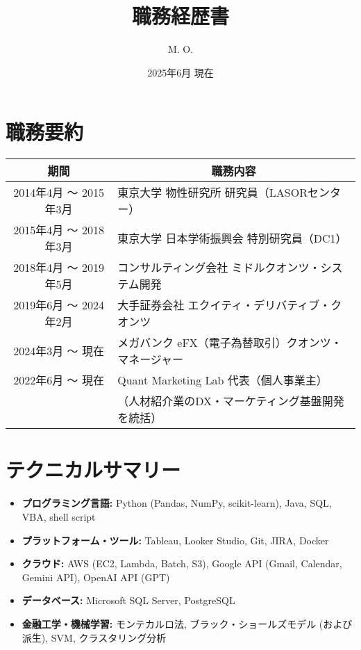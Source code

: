 \documentclass[uplatex,a4j,10.5pt,dvipdfmx]{jsarticle}
\title{\sffamily \bfseries 職務経歴書}
\author{M. O.}
\date{2025年6月 現在}
\begin{document}
\maketitle

\section{職務要約}

\begin{longtable}{|c|p{14cm}|}
	\hline
	\multicolumn{1}{|c|}{\textbf{期間}} & \multicolumn{1}{c|}{\textbf{職務内容}} \\
	\hline
	\endhead

	\hline
	2014年4月 ～ 2015年3月                 & 東京大学 物性研究所 研究員（LASORセンター）          \\
	\hline
	2015年4月 ～ 2018年3月                 & 東京大学 日本学術振興会 特別研究員（DC1）            \\
	\hline
	2018年4月 ～ 2019年5月                 & コンサルティング会社 ミドルクオンツ・システム開発          \\
	\hline
	2019年6月 ～ 2024年2月                 & 大手証券会社 エクイティ・デリバティブ・クオンツ           \\
	\hline
	2024年3月 ～ 現在                      & メガバンク eFX（電子為替取引）クオンツ・マネージャー       \\
    \hline
    2022年6月 ～ 現在 & Quant Marketing Lab 代表（個人事業主） \\
     & （人材紹介業のDX・マーケティング基盤開発を統括） \\
    \hline
\end{longtable}

\section{テクニカルサマリー}
\begin{itemize}
	\item \textbf{プログラミング言語:} Python (Pandas, NumPy, scikit-learn), Java, SQL, VBA, shell script
	\item \textbf{プラットフォーム・ツール:} Tableau, Looker Studio, Git, JIRA, Docker
	\item \textbf{クラウド:} AWS (EC2, Lambda, Batch, S3), Google API (Gmail, Calendar, Gemini API), OpenAI API (GPT)
	\item \textbf{データベース:} Microsoft SQL Server, PostgreSQL
	\item \textbf{金融工学・機械学習:} モンテカルロ法, ブラック・ショールズモデル (および派生), SVM, クラスタリング分析
\end{itemize}
\end{document}
